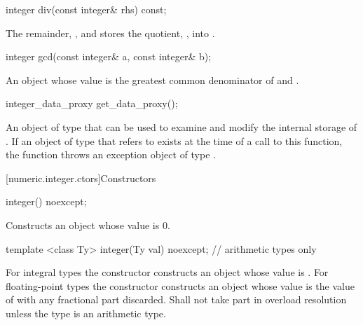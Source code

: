 \begin{itemdecl}
integer div(const integer& rhs) const;	
\end{itemdecl}

\begin{itemdescr}
\returns The remainder, , and stores the quotient, , into .	
\end{itemdescr}

\begin{itemdecl}
integer gcd(const integer& a, const integer& b);	
\end{itemdecl}

\begin{itemdescr}
\returns An object whose value is the greatest common denominator of  and .		
\end{itemdescr}

\begin{itemdecl}
integer_data_proxy get_data_proxy();	
\end{itemdecl}

\begin{itemdescr}
\returns An object of type  that can be used to examine and modify the internal storage of . If an object of type  that refers to  exists at the time of a call to this function, the function throws an exception object of type .		
\end{itemdescr}

[numeric.integer.ctors]{Constructors}

\begin{itemdecl}
integer() noexcept;	
\end{itemdecl}

\begin{itemdescr}
\effects Constructs an object whose value is 0.		
\end{itemdescr}

\begin{itemdecl}
template <class Ty>
  integer(Ty val) noexcept; // arithmetic types only	
\end{itemdecl}

\begin{itemdescr}
\effects For integral types the constructor constructs an object whose value is . For floating-point types the constructor constructs an object whose value is the value of  with any fractional part discarded. Shall not take part in overload resolution unless the type  is an arithmetic type. 		
\end{itemdescr}

